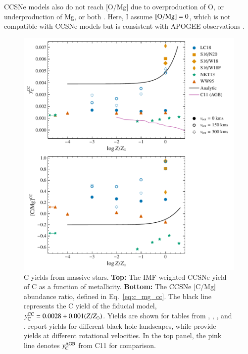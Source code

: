 \documentclass[12pt,oneside]{report}
\newcommand{\Ycc}{\ensuremath{y_{\rm C}^{\rm CC}}}
\newcommand{\Ycagb}{\ensuremath{y_{\rm C}^{\rm AGB}}}
\begin{document}
CCSNe models also do not reach [O/Mg] due to overproduction of O, or underproduction of Mg, or both \citep{emily+21}. Here, I assume ${\rm [O/Mg]} = 0$, which is not compatible with CCSNe models but is consistent with APOGEE observations \citep{weinberg+19, weinberg+22}.
    

\begin{figure}[htp]
    \centering
    \includegraphics{y_c_cc.pdf}
    \caption[CCSNe C yields]{
        C yields from massive stars.
        \textbf{Top:} The IMF-weighted CCSNe yield of C as a function of metallicity.
        \textbf{Bottom:} The CCSNe [C/Mg] abundance ratio, defined in Eq.~\ref{eq:c_mg_cc}. The black line represents the C yield of the fiducial model,
    $\Ycc = 0.0028 + 0.001 (Z/Z_{\odot})$. Yields are shown for tables from 
    \citet[red triangles]{WW95}, \citet[orange squares and diamonds]{sukhbold+16}, 
    \citet[green stars]{NKT13}, and \citet[blue circles]{LC18}. \citet{sukhbold+16} report yields for different black hole landscapes, while \citet{LC18} provide yields at different rotational velocities.
In the top panel, the pink line denotes $\Ycagb$ from C11 for comparison.
}
    \label{fig:y_cc}
\end{figure}
\end{document}
